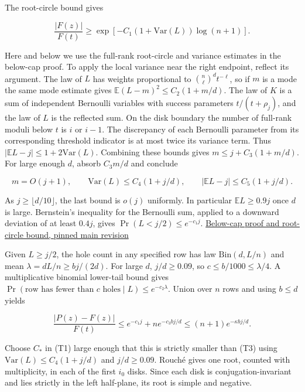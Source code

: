 The root-circle bound gives

\begin{equation}
\frac{|F(z)|}{F(t)}
\ge\exp[-C_1(1+\mathrm{Var}(L))\log(n+1)] .
\tag{T3}
\end{equation}

Here and below we use the full-rank root-circle and variance estimates in the below-cap proof. To apply the local variance near the right endpoint, reflect its argument. The law of $L$ has weights proportional to $\binom n\ell^d t^{-\ell}$, so if $m$ is a mode the same mode estimate gives $\mathbb E(L-m)^2\le C_2(1+m/d)$. The law of $K$ is a sum of independent Bernoulli variables with success parameters $t/(t+\rho_j)$, and the law of $L$ is the reflected sum. On the disk boundary the number of full-rank moduli below $t$ is $i$ or $i-1$. The discrepancy of each Bernoulli parameter from its corresponding threshold indicator is at most twice its variance term. Thus $|\mathbb E L-j|\le1+2\mathrm{Var}(L)$. Combining these bounds gives $m\le j+C_3(1+m/d)$. For large enough $d$, absorb $C_3m/d$ and conclude

\begin{equation*}
m=O(j+1),\qquad
\mathrm{Var}(L)\le C_4(1+j/d),\qquad
|\mathbb E L-j|\le C_5(1+j/d).
\end{equation*}

As $j\ge\lfloor d/10\rfloor$, the last bound is $o(j)$ uniformly. In particular $\mathbb E L\ge 0.9j$ once $d$ is large. Bernstein's inequality for the Bernoulli sum, applied to a downward deviation of at least $0.4j$, gives $\Pr(L<j/2)\le e^{-c_1j}$. \href{https://github.com/ProgramComputer/open-math-research/blob/4fb624ba937a8eecc1361a6066185cd81ab7b172/topics/balanced-arrays/dense-regime/below-cap/proof.md}{Below-cap proof and root-circle bound, pinned main revision}

Given $L\ge j/2$, the hole count in any specified row has law $\mathrm{Bin}(d,L/n)$ and mean $\lambda=dL/n\ge b j/(2d)$. For large $d$, $j/d\ge0.09$, so $c\le b/1000\le\lambda/4$. A multiplicative binomial lower-tail bound gives $\Pr(\text{row has fewer than }c\text{ holes}\mid L)\le e^{-c_2\lambda}$. Union over $n$ rows and using $b\le d$ yields

\begin{equation*}
\frac{|P(z)-F(z)|}{F(t)}
\le e^{-c_1j}+n e^{-c_3 b j/d}
\le (n+1)e^{-\kappa b j/d}.
\end{equation*}

Choose $C_*$ in (T1) large enough that this is strictly smaller than (T3) using $\mathrm{Var}(L)\le C_4(1+j/d)$ and $j/d\ge0.09$. Rouché gives one root, counted with multiplicity, in each of the first $i_0$ disks. Since each disk is conjugation-invariant and lies strictly in the left half-plane, its root is simple and negative.


